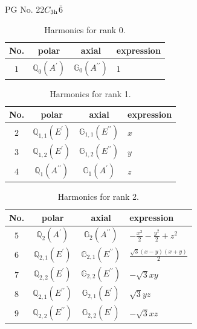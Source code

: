 \documentclass[fleqn,8pt,landscape]{jsarticle}
\begin{document}
\setcounter{MaxMatrixCols}{32}

\renewcommand{\tablename}{Table~}
\renewcommand{\figurename}{Figure~}
\begin{center}
\LARGE
PG No. 22\quad$C_{\rm 3h}$\quad$\bar{6}$\quad[ hexagonal ]
\end{center}
\begin{table}[ht!]
\begin{center}
\caption{Harmonics for rank 0.}
\renewcommand{\arraystretch}{1.3}
\begin{tabular}{cccl} \hline \hline
No. & polar & axial & expression \\ \hline
$ 1 $ & $ \mathbb{Q}_{0}(A^{\prime}) $ & $ \mathbb{G}_{0}(A^{\prime\prime}) $ & $ 1 $ \\
 \hline \hline
\end{tabular}
\end{center}
\end{table}
\begin{table}[ht!]
\begin{center}
\caption{Harmonics for rank 1.}
\renewcommand{\arraystretch}{1.3}
\begin{tabular}{cccl} \hline \hline
No. & polar & axial & expression \\ \hline
$ 2 $ & $ \mathbb{Q}_{1,1}(E^{\prime}) $ & $ \mathbb{G}_{1,1}(E^{\prime\prime}) $ & $ x $ \\
$ 3 $ & $ \mathbb{Q}_{1,2}(E^{\prime}) $ & $ \mathbb{G}_{1,2}(E^{\prime\prime}) $ & $ y $ \\
$ 4 $ & $ \mathbb{Q}_{1}(A^{\prime\prime}) $ & $ \mathbb{G}_{1}(A^{\prime}) $ & $ z $ \\
 \hline \hline
\end{tabular}
\end{center}
\end{table}
\begin{table}[ht!]
\begin{center}
\caption{Harmonics for rank 2.}
\renewcommand{\arraystretch}{1.3}
\begin{tabular}{cccl} \hline \hline
No. & polar & axial & expression \\ \hline
$ 5 $ & $ \mathbb{Q}_{2}(A^{\prime}) $ & $ \mathbb{G}_{2}(A^{\prime\prime}) $ & $ - \frac{x^{2}}{2} - \frac{y^{2}}{2} + z^{2} $ \\
$ 6 $ & $ \mathbb{Q}_{2,1}(E^{\prime}) $ & $ \mathbb{G}_{2,1}(E^{\prime\prime}) $ & $ \frac{\sqrt{3} \left(x - y\right) \left(x + y\right)}{2} $ \\
$ 7 $ & $ \mathbb{Q}_{2,2}(E^{\prime}) $ & $ \mathbb{G}_{2,2}(E^{\prime\prime}) $ & $ - \sqrt{3} x y $ \\
$ 8 $ & $ \mathbb{Q}_{2,1}(E^{\prime\prime}) $ & $ \mathbb{G}_{2,1}(E^{\prime}) $ & $ \sqrt{3} y z $ \\
$ 9 $ & $ \mathbb{Q}_{2,2}(E^{\prime\prime}) $ & $ \mathbb{G}_{2,2}(E^{\prime}) $ & $ - \sqrt{3} x z $ \\
 \hline \hline
\end{tabular}
\end{center}
\end{table}
\end{document}
